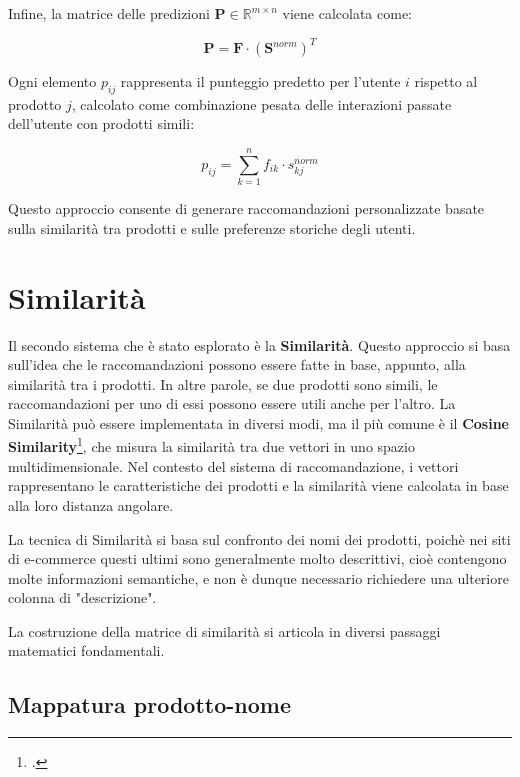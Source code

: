 Infine, la matrice delle predizioni $\mathbf{P} \in \mathbb{R}^{m \times n}$ viene calcolata come:

\begin{equation}
\mathbf{P} = \mathbf{F} \cdot (\mathbf{S}^{norm})^T
\end{equation}

Ogni elemento $p_{ij}$ rappresenta il punteggio predetto per l'utente $i$ rispetto al prodotto $j$, calcolato come combinazione pesata delle interazioni passate dell'utente con prodotti simili:

\begin{equation}
p_{ij} = \sum_{k=1}^{n} f_{ik} \cdot s_{kj}^{norm}
\end{equation}

Questo approccio consente di generare raccomandazioni personalizzate basate sulla similarità tra prodotti e sulle preferenze storiche degli utenti.


\section{Similarità}

Il secondo sistema che è stato esplorato è la \textbf{Similarità}. Questo approccio si basa sull'idea che le raccomandazioni possono essere fatte in base, appunto, alla similarità tra i prodotti. In altre parole, se due prodotti sono simili, le raccomandazioni per uno di essi possono essere utili anche per l'altro. La Similarità può essere implementata in diversi modi, ma il più comune è il \textbf{Cosine Similarity}\footcite{site:cosine-similarity}, che misura la similarità tra due vettori in uno spazio multidimensionale. Nel contesto del sistema di raccomandazione, i vettori rappresentano le caratteristiche dei prodotti e la similarità viene calcolata in base alla loro distanza angolare.

La tecnica di Similarità si basa sul confronto dei nomi dei prodotti, poichè nei siti di e-commerce questi ultimi sono generalmente molto descrittivi, cioè contengono molte informazioni semantiche, e non è dunque necessario richiedere una ulteriore colonna di "descrizione".

La costruzione della matrice di similarità si articola in diversi passaggi matematici fondamentali.

\subsection{Mappatura prodotto-nome}

